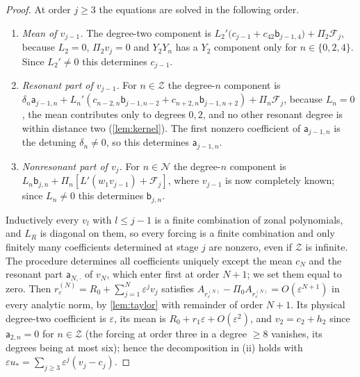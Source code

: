 \documentclass[11pt]{amsart}
\numberwithin{equation}{section}
\theoremstyle{definition}
\theoremstyle{remark}
\newcommand{\eps}{\varepsilon}
\begin{document}
\begin{proof}
At order $j\ge3$ the equations are solved in the following order.
\begin{enumerate}[label=(\arabic*)]
\item \emph{Mean of $v_{j-1}$.} The degree-two component is $L_2'\bigl(c_{j-1}+c_{42}\mathsf b_{j-1,4}\bigr)+\Pi_2\mathcal F_j$, because $L_2=0$, $\Pi_2v_j=0$ and $Y_2Y_n$ has a $Y_2$ component only for $n\in\{0,2,4\}$. Since $L_2'\ne0$ this determines $c_{j-1}$.
\item \emph{Resonant part of $v_{j-1}$.} For $n\in\mathcal Z$ the degree-$n$ component is $\delta_n\mathsf a_{j-1,n}+L_n'(c_{n-2,n}\mathsf b_{j-1,n-2}+c_{n+2,n}\mathsf b_{j-1,n+2})+\Pi_n\mathcal F_j$, because $L_n=0$, the mean contributes only to degrees $0,2$, and no other resonant degree is within distance two (\cref{lem:kernel}). The first nonzero coefficient of $\mathsf a_{j-1,n}$ is the detuning $\delta_n\ne0$, so this determines $\mathsf a_{j-1,n}$.
\item \emph{Nonresonant part of $v_j$.} For $n\in\mathcal N$ the degree-$n$ component is $L_n\mathsf b_{j,n}+\Pi_n[L'(w_1v_{j-1})+\mathcal F_j]$, where $v_{j-1}$ is now completely known; since $L_n\ne0$ this determines $\mathsf b_{j,n}$.
\end{enumerate}
Inductively every $v_l$ with $l\le j-1$ is a finite combination of zonal polynomials, and $L_R$ is diagonal on them, so every forcing is a finite combination and only finitely many coefficients determined at stage $j$ are nonzero, even if $\mathcal Z$ is infinite. The procedure determines all coefficients uniquely except the mean $c_N$ and the resonant part $\mathsf a_{N,\cdot}$ of $v_N$, which enter first at order $N+1$; we set them equal to zero. Then $r^{(N)}_\eps=R_0+\sum_{j=1}^N\eps^jv_j$ satisfies $A_{r^{(N)}_\eps}-\Pi_0A_{r^{(N)}_\eps}=O(\eps^{N+1})$ in every analytic norm, by \cref{lem:taylor} with remainder of order $N+1$. Its physical degree-two coefficient is $\eps$, its mean is $R_0+r_1\eps+O(\eps^2)$, and $v_2=c_2+h_2$ since $\mathsf a_{2,n}=0$ for $n\in\mathcal Z$ (the forcing at order three in a degree $\ge8$ vanishes, its degrees being at most six); hence the decomposition in (ii) holds with $\eps u_*=\sum_{j\ge3}\eps^j(v_j-c_j)$.


\end{proof}
\end{document}
